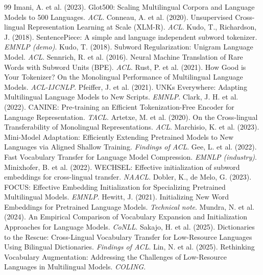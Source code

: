 \documentclass[11pt,a4paper]{article}
\begin{document}
\begin{thebibliography}{99}
\small
{} Imani, A. et al. (2023). Glot500: Scaling Multilingual Corpora and Language Models to 500 Languages. \textit{ACL}.
 Conneau, A. et al. (2020). Unsupervised Cross-lingual Representation Learning at Scale (XLM-R). \textit{ACL}.
 Kudo, T., Richardson, J. (2018). SentencePiece: A simple and language independent subword tokenizer. \textit{EMNLP (demo)}.
 Kudo, T. (2018). Subword Regularization: Unigram Language Model. \textit{ACL}.
 Sennrich, R. et al. (2016). Neural Machine Translation of Rare Words with Subword Units (BPE). \textit{ACL}.
 Rust, P. et al. (2021). How Good is Your Tokenizer? On the Monolingual Performance of Multilingual Language Models. \textit{ACL-IJCNLP}.
 Pfeiffer, J. et al. (2021). UNKs Everywhere: Adapting Multilingual Language Models to New Scripts. \textit{EMNLP}.
 Clark, J. H. et al. (2022). CANINE: Pre-training an Efficient Tokenization-Free Encoder for Language Representation. \textit{TACL}.
 Artetxe, M. et al. (2020). On the Cross-lingual Transferability of Monolingual Representations. \textit{ACL}.
 Marchisio, K. et al. (2023). Mini-Model Adaptation: Efficiently Extending Pretrained Models to New Languages via Aligned Shallow Training. \textit{Findings of ACL}.
 Gee, L. et al. (2022). Fast Vocabulary Transfer for Language Model Compression. \textit{EMNLP (industry)}.
 Minixhofer, B. et al. (2022). WECHSEL: Effective initialization of subword embeddings for cross-lingual transfer. \textit{NAACL}.
 Dobler, K., de Melo, G. (2023). FOCUS: Effective Embedding Initialization for Specializing Pretrained Multilingual Models. \textit{EMNLP}.
 Hewitt, J. (2021). Initializing New Word Embeddings for Pretrained Language Models. \textit{Technical note}.
 Mundra, N. et al. (2024). An Empirical Comparison of Vocabulary Expansion and Initialization Approaches for Language Models. \textit{CoNLL}.
 Sakajo, H. et al. (2025). Dictionaries to the Rescue: Cross-Lingual Vocabulary Transfer for Low-Resource Languages Using Bilingual Dictionaries. \textit{Findings of ACL}.
 Lin, N. et al. (2025). Rethinking Vocabulary Augmentation: Addressing the Challenges of Low-Resource Languages in Multilingual Models. \textit{COLING}.

\end{thebibliography}
\end{document}
